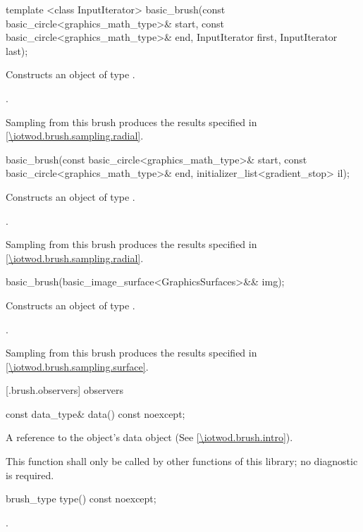%
\begin{itemdecl}
template <class InputIterator>
basic_brush(const basic_circle<graphics_math_type>& start,
  const basic_circle<graphics_math_type>& end,
  InputIterator first, InputIterator last);
\end{itemdecl}
\begin{itemdescr}
\pnum
\effects
Constructs an object of type .

\pnum
\postconditions
{}.

\pnum
\remarks
Sampling from this brush produces the results specified in \ref{\iotwod.brush.sampling.radial}.
\end{itemdescr}

%
\begin{itemdecl}
basic_brush(const basic_circle<graphics_math_type>& start,
  const basic_circle<graphics_math_type>& end,
  initializer_list<gradient_stop> il);
\end{itemdecl}
\begin{itemdescr}
\pnum
\effects
Constructs an object of type .

\pnum
\postconditions
{}.

\pnum
\remarks
Sampling from this brush produces the results specified in \ref{\iotwod.brush.sampling.radial}.
\end{itemdescr}

%
\begin{itemdecl}
basic_brush(basic_image_surface<GraphicsSurfaces>&& img);
\end{itemdecl}
\begin{itemdescr}
\pnum
\effects
Constructs an object of type .

\pnum
\postconditions
{}.

\pnum
Sampling from this brush produces the results specified in \ref{\iotwod.brush.sampling.surface}.
\end{itemdescr}

 [\iotwod.brush.observers]{ observers}

\begin{itemdecl}
const data_type& data() const noexcept;
\end{itemdecl}
\begin{itemdescr}
\pnum
\returns
A reference to the  object's data object (See \ref{\iotwod.brush.intro}).

\pnum
\remarks
This function shall only be called by other functions of this library; no diagnostic is required.
\end{itemdescr}

%
\begin{itemdecl}
brush_type type() const noexcept;
\end{itemdecl}
\begin{itemdescr}
\pnum
\returns
{}.
\end{itemdescr}
